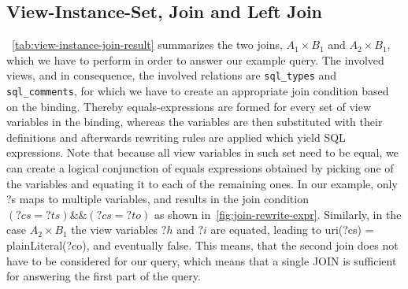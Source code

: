 \documentclass[a4paper,twoside,bibtotoc,abstracton,12pt,BCOR=15mm]{scrreprt}
\begin{document}
\subsection{View-Instance-Set, Join and Left Join}
~\autoref{tab:view-instance-join-result} summarizes the two joins, $A_1 \times B_1$ and $A_2 \times B_1$, which we have to perform in order to answer our example query.
The involved views, and in consequence, the involved relations are \texttt{sql\_types} and \texttt{sql\_comments}, for which we have to create an appropriate join condition
based on the binding.
Thereby equals-expressions are formed for every set of view variables in the binding, whereas the variables are then substituted with their definitions and afterwards rewriting rules are
applied which yield SQL expressions.
Note that because all view variables in such set need to be equal,
we can create a logical conjunction of equals expressions obtained by
picking one of the variables and equating it to each of the remaining ones.
In our example, only ?s maps to multiple variables, and results in the join condition $(?cs = ?ts) \&\& (?cs = ?to)$ as shown in~\autoref{fig:join-rewrite-expr}. 
Similarly, in the case $A_2 \times B_1$ the view variables $?h$ and $?i$ are equated, leading to uri(?cs) = plainLiteral(?co), and eventually false.
This means, that the second join does not have to be considered for our query, which means that a single JOIN is sufficient for answering the
first part of the query.
\end{document}
